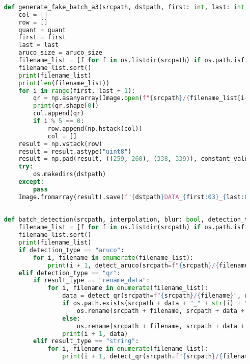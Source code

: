 \begin{lstlisting}[language=Python]
    
    def generate_fake_batch_a3(srcpath, dstpath, first: int, last: int, aruco_size: int = 30, quant: int = 2):
        col = []
        row = []
        quant = quant
        first = first
        last = last
        aruco_size = aruco_size
        filename_list = [f for f in os.listdir(srcpath) if os.path.isfile(srcpath + "/" + f)]
        filename_list.sort()
        print(filename_list)
        print(len(filename_list))
        for i in range(first, last + 1):
            qr = np.asanyarray(Image.open(f"{srcpath}/{filename_list[i-1]}").convert("L"))
            print(qr.shape[0])
            col.append(qr)
            if i % 5 == 0:
                row.append(np.hstack(col))
                col = []
        result = np.vstack(row)
        result = result.astype("uint8")
        result = np.pad(result, ((259, 260), (338, 339)), constant_values=255)  # Y dulu baru X
        try:
            os.makedirs(dstpath)
        except:
            pass
        Image.fromarray(result).save(f"{dstpath}DATA_{first:03}_{last:03}_{quant}LEVEL_ARC{aruco_size}_FAKE.png")
    
    
    def batch_detection(srcpath, interpolation, blur: bool, detection_type: str, result_type: str, ksize: int = 7):
        filename_list = [f for f in os.listdir(srcpath) if os.path.isfile(srcpath + "/" + f)]
        filename_list.sort()
        print(filename_list)
        if detection_type == "aruco":
            for i, filename in enumerate(filename_list):
                print(i + 1, detect_aruco(srcpath=f"{srcpath}/{filename}", result_type=result_type, blur=blur, ksize=ksize, interpolation=interpolation))
        elif detection_type == "qr":
            if result_type == "rename_data":
                for i, filename in enumerate(filename_list):
                    data = detect_qr(srcpath=f"{srcpath}/{filename}", result_type="data", blur=blur, ksize=ksize, interpolation=interpolation)
                    if os.path.exists(srcpath + data + "_" + str(i) + "." + filename.split(".")[1].split("_")[0]):
                        os.rename(srcpath + filename, srcpath + data + "_" + str(i) + "." + filename.split(".")[1].split("_")[0])
                    else:
                        os.rename(srcpath + filename, srcpath + data + "." + filename.split(".")[1].split("_")[0])
                    print(i + 1, data)
            elif result_type == "string":
                for i, filename in enumerate(filename_list):
                    print(i + 1, detect_qr(srcpath=f"{srcpath}/{filename}", result_type=result_type, interpolation=interpolation))
    

\end{lstlisting}
